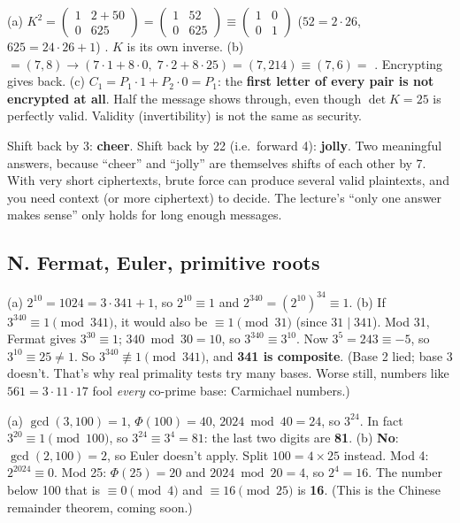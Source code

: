 \ans (a) $K^2 = \begin{pmatrix}1 & 2 + 50\\ 0 & 625\end{pmatrix} = \begin{pmatrix}1&52\\0&625\end{pmatrix} \equiv \begin{pmatrix}1&0\\0&1\end{pmatrix}$ ($52 = 2\cdot26$, $625 = 24\cdot26 + 1$) \checkmark. $K$ is its own inverse.
(b)  $= (7, 8) \to (7\cdot1 + 8\cdot0,\; 7\cdot2 + 8\cdot25) = (7, 214) \equiv (7, 6) = $ . Encrypting  gives  back.
(c) $C_1 = P_1\cdot1 + P_2\cdot0 = P_1$: the \textbf{first letter of every pair is not encrypted at all}. Half the message shows through, even though $\det K = 25$ is perfectly valid. Validity (invertibility) is not the same as security.

\ans Shift back by 3: \textbf{cheer}. Shift back by 22 (i.e.\ forward 4): \textbf{jolly}. Two meaningful answers, because ``cheer'' and ``jolly'' are themselves shifts of each other by 7.
With very short ciphertexts, brute force can produce several valid plaintexts, and you need context (or more ciphertext) to decide. The lecture's ``only one answer makes sense'' only holds for long enough messages.

\subsection*{N. Fermat, Euler, primitive roots}

\ans (a) $2^{10} = 1024 = 3\cdot341 + 1$, so $2^{10} \equiv 1$ and $2^{340} = (2^{10})^{34} \equiv 1$.
(b) If $3^{340} \equiv 1 \pmod{341}$, it would also be $\equiv 1 \pmod{31}$ (since $31 \mid 341$). Mod 31, Fermat gives $3^{30} \equiv 1$; $340 \bmod 30 = 10$, so $3^{340} \equiv 3^{10}$. Now $3^5 = 243 \equiv -5$, so $3^{10} \equiv 25 \ne 1$.
So $3^{340} \not\equiv 1 \pmod{341}$, and \textbf{341 is composite}. (Base 2 lied; base 3 doesn't. That's why real primality tests try many bases. Worse still, numbers like $561 = 3\cdot11\cdot17$ fool \emph{every} co-prime base: Carmichael numbers.)

\ans (a) $\gcd(3, 100) = 1$, $\Phi(100) = 40$, $2024 \bmod 40 = 24$, so $3^{24}$. In fact $3^{20} \equiv 1 \pmod{100}$, so $3^{24} \equiv 3^4 = 81$: the last two digits are \textbf{81}.
(b) \textbf{No}: $\gcd(2, 100) = 2$, so Euler doesn't apply. Split $100 = 4 \times 25$ instead.
Mod 4: $2^{2024} \equiv 0$. Mod 25: $\Phi(25) = 20$ and $2024 \bmod 20 = 4$, so $2^4 = 16$.
The number below 100 that is $\equiv 0 \pmod 4$ and $\equiv 16 \pmod{25}$ is \textbf{16}. (This is the Chinese remainder theorem, coming soon.)

